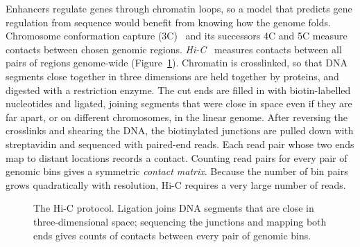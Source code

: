 Enhancers regulate genes through chromatin loops, so a model that predicts gene regulation from sequence would benefit from knowing how the genome folds. Chromosome conformation capture (3C)~\citep{dekker2002} and its successors 4C and 5C measure contacts between chosen genomic regions. \emph{Hi-C}~\citep{lieberman2009} measures contacts between all pairs of regions genome-wide (Figure~\ref{fig:hic_protocol}). Chromatin is crosslinked, so that DNA segments close together in three dimensions are held together by proteins, and digested with a restriction enzyme. The cut ends are filled in with biotin-labelled nucleotides and ligated, joining segments that were close in space even if they are far apart, or on different chromosomes, in the linear genome. After reversing the crosslinks and shearing the DNA, the biotinylated junctions are pulled down with streptavidin and sequenced with paired-end reads. Each read pair whose two ends map to distant locations records a contact. Counting read pairs for every pair of genomic bins gives a symmetric \emph{contact matrix}. Because the number of bin pairs grows quadratically with resolution, Hi-C requires a very large number of reads.

\begin{figure}[t]
  \centering
  \caption{The Hi-C protocol. Ligation joins DNA segments that are close in three-dimensional space; sequencing the junctions and mapping both ends gives counts of contacts between every pair of genomic bins.}
  \label{fig:hic_protocol}
\end{figure}

